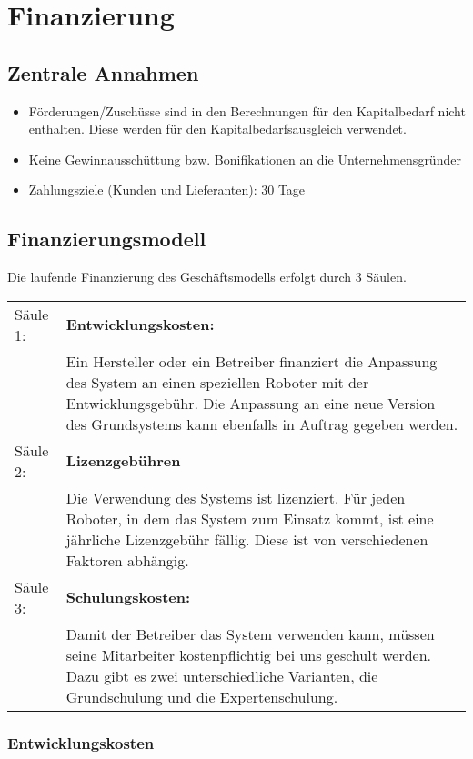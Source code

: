 \chapter{Finanzierung}
\section{Zentrale Annahmen}
\begin{itemize}
	\item Förderungen/Zuschüsse sind in den Berechnungen für den Kapitalbedarf nicht enthalten. Diese werden \ggf für den Kapitalbedarfsausgleich verwendet.
	\item Keine Gewinnausschüttung bzw. Bonifikationen an die Unternehmensgründer
	\item Zahlungsziele (Kunden und Lieferanten): 30 Tage
\end{itemize}

\section{Finanzierungsmodell}
Die laufende Finanzierung des Geschäftsmodells erfolgt durch 3 Säulen. 

\noindent
\begin{tabular}{@{}>{\raggedright\arraybackslash}p{1.8cm}@{}>{\raggedright\arraybackslash}p{\textwidth - 1.8cm}}
 
	Säule 1: & \textbf{Entwicklungskosten:}\\
	& Ein Hersteller oder ein Betreiber finanziert die Anpassung des System an einen speziellen Roboter mit der Entwicklungsgebühr. Die Anpassung an eine neue Version des Grundsystems kann ebenfalls in Auftrag gegeben werden.\\ 

	Säule 2: & \textbf{Lizenzgebühren}\\
	& Die Verwendung des Systems ist lizenziert. Für jeden Roboter, in dem das System zum Einsatz kommt, ist eine jährliche Lizenzgebühr fällig. Diese ist von verschiedenen Faktoren abhängig. \\
	
	Säule 3: & \textbf{Schulungskosten:}\\
	& Damit der Betreiber das System verwenden kann, müssen seine Mitarbeiter kostenpflichtig bei uns geschult werden. Dazu gibt es zwei unterschiedliche Varianten, die Grundschulung und die Expertenschulung.
\end{tabular}

\subsection{Entwicklungskosten}
